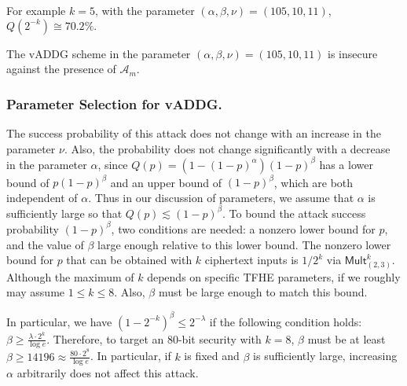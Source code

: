 \documentclass[runningheads]{llncs}
\newcommand{\cc}[1]{\mathcal{#1}} %
\begin{document}
        For example $k=5$, with the parameter $(\alpha, \beta,\nu)=(105,10,11)$, $Q(2^{-k})\cong70.2\%.$
        \begin{corollary}
            The {\rm vADDG} scheme in the parameter $(\alpha, \beta,\nu)=(105,10,11)$ is insecure against the presence of $\cc A_m$.
        \end{corollary}


        \subsubsection{Parameter Selection for vADDG.} 
        The success probability of this attack does not change with an increase in the parameter $\nu$. 
        Also, the probability does not change significantly with a decrease in the parameter $\alpha$, since 
            $Q(p) = (1 - (1-p)^\alpha)(1-p)^\beta$
        has a lower bound of 
        $p(1-p)^\beta$ and an upper bound of $(1-p)^\beta$, which are both independent of $\alpha$. Thus in our discussion of parameters, we assume that \(\alpha\) is sufficiently large so that \(Q(p) \lesssim (1-p)^\beta\). To bound the attack success probability \((1-p)^\beta\), two conditions are needed: a nonzero lower bound for \(p\), and the value of \(\beta\) large enough relative to this lower bound.
        The nonzero lower bound for $p$ that can be obtained with $k$ ciphertext inputs is $1/2^{k}$ via $\mathsf{Mult}^k_{(2,3)}$. Although the maximum of $k$ depends on specific TFHE parameters, if we roughly may assume $1\leq k\leq 8.$
        Also, $\beta$ must be large enough to match this bound. 
        
        In particular, we have $(1-2^{-k})^\beta \le 2^{-\lambda}$ if the following condition holds: $\beta \ge \frac{\lambda\cdot 2^k}{\log e}$. Therefore, to target an 80-bit security with $k = 8$, $\beta$ must be at least $\beta \ge 14196 \approx \frac{80\cdot 2^8}{\log e}$. In particular, if $k$ is fixed and $\beta$ is sufficiently large, increasing $\alpha$ arbitrarily does not affect this attack. 
        
\end{document}
